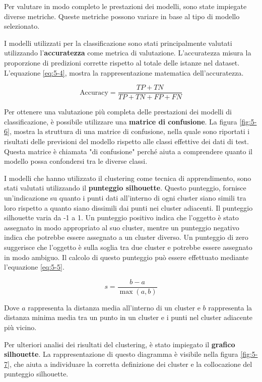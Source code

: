 Per valutare in modo completo le prestazioni dei modelli, sono state impiegate diverse metriche. Queste metriche possono variare in base al tipo di modello selezionato.

\bigskip

I modelli utilizzati per la classificazione sono stati principalmente valutati utilizzando l'\textbf{accuratezza} come metrica di valutazione. L'accuratezza misura la proporzione di predizioni corrette rispetto al totale delle istanze nel dataset. L'equazione \ref{eq:5-4}, mostra la rappresentazione matematica dell'accuratezza.

\begin{equation}
    \boxed{
        \text{Accuracy} = \frac{TP + TN}{TP + TN + FP + FN}
    }
    \label{eq:5-4}
\end{equation}

\bigskip

Per ottenere una valutazione più completa delle prestazioni dei modelli di classificazione, è possibile utilizzare una \textbf{matrice di confusione}. La figura \ref{fig:5-6}, mostra la struttura di una matrice di confusione, nella quale sono riportati i risultati delle previsioni del modello rispetto alle classi effettive dei dati di test. Questa matrice è chiamata "di confusione" perché aiuta a comprendere quanto il modello possa confondersi tra le diverse classi.

\bigskip

I modelli che hanno utilizzato il clustering come tecnica di apprendimento, sono stati valutati utilizzando il \textbf{punteggio silhouette}. Questo punteggio, fornisce un'indicazione su quanto i punti dati all'interno di ogni cluster siano simili tra loro rispetto a quanto siano dissimili dai punti nei cluster adiacenti. Il punteggio silhouette varia da -1 a 1. Un punteggio positivo indica che l'oggetto è stato assegnato in modo appropriato al suo cluster, mentre un punteggio negativo indica che potrebbe essere assegnato a un cluster diverso. Un punteggio di zero suggerisce che l'oggetto è sulla soglia tra due cluster e potrebbe essere assegnato in modo ambiguo. Il calcolo di questo punteggio può essere effettuato mediante l'equazione \ref{eq:5-5}.

\begin{equation}
    \boxed{
        s = \frac{b - a}{\max(a, b)}
    }
    \label{eq:5-5}
\end{equation}

\bigskip

Dove \( a \) rappresenta la distanza media all'interno di un cluster e \( b \) rappresenta la distanza minima media tra un punto in un cluster e i punti nel cluster adiacente più vicino.

\bigskip

Per ulteriori analisi dei risultati del clustering, è stato impiegato il \textbf{grafico silhouette}. La rappresentazione di questo diagramma è visibile nella figura \ref{fig:5-7}, che aiuta a individuare la corretta definizione dei cluster e la collocazione del punteggio silhouette.